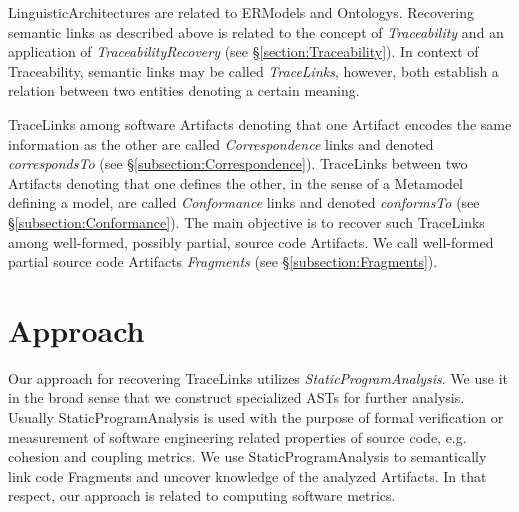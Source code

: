 \Glspl{LinguisticArchitecture} are related to \glspl{ERModel} and \glspl{Ontology}.
Recovering semantic links as described above is related to the concept of \textit{\gls{Traceability}} and an application of \textit{\gls{TraceabilityRecovery}} \cite{DBLP:books/daglib/p/GotelCHZEGDAMM12} (see §\ref{section:Traceability}).
In context of \gls{Traceability}, semantic links may be called \textit{\glspl{TraceLink}}, however, both establish a relation between two entities denoting a certain meaning.

\Glspl{TraceLink} among software \glspl{Artifact} denoting that one \gls{Artifact} encodes the same information as the other are called \textit{\gls{Correspondence}} links and denoted \textit{correspondsTo} (see §\ref{subsection:Correspondence}).
\Glspl{TraceLink} between two \glspl{Artifact} denoting that one defines the other, in the sense of a \gls{Metamodel} defining a model, are called \textit{\gls{Conformance}} links and denoted \textit{conformsTo} (see §\ref{subsection:Conformance}).
The main objective is to recover such \glspl{TraceLink} among well-formed, possibly partial, source code \glspl{Artifact}.
We call well-formed partial source code \glspl{Artifact} \textit{\glspl{Fragment}} (see §\ref{subsection:Fragments}).
 

\section{Approach}
\label{section:Approach}
Our approach for recovering \glspl{TraceLink} utilizes \textit{\gls{StaticProgramAnalysis}}.
We use it in the broad sense that we construct specialized \glspl{AST} for further analysis.
Usually \gls{StaticProgramAnalysis} is used with the purpose of formal verification or measurement of software engineering related properties of source code, e.g. cohesion and coupling metrics.
We use \gls{StaticProgramAnalysis} to semantically link code \glspl{Fragment} and uncover knowledge of the analyzed \glspl{Artifact}.
In that respect, our approach is related to computing software metrics.

